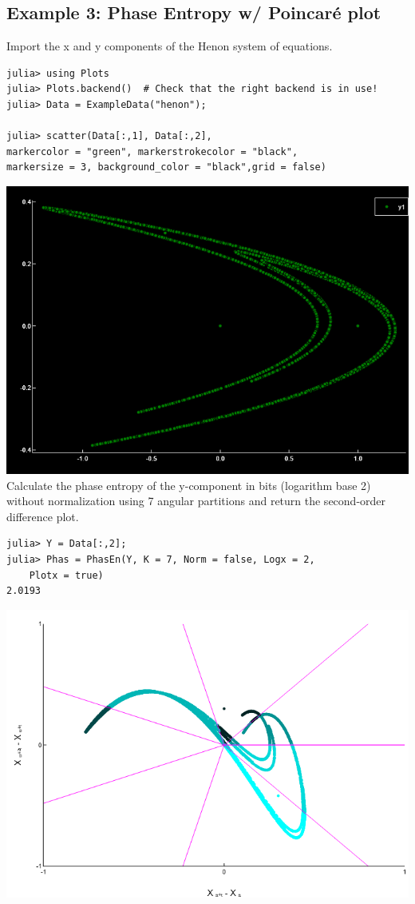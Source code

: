 \documentclass[12pt, a4paper, titlepage, openany]{book}
\begin{document}
\newpage
\subsection{\normalsize Example 3: \hspace{15mm} Phase Entropy w/ Poincaré plot}
\noindent Import the x and y components of the Henon system of equations.
\begin{verbatim}
julia> using Plots
julia> Plots.backend()  # Check that the right backend is in use! 
julia> Data = ExampleData("henon");

julia> scatter(Data[:,1], Data[:,2], 
markercolor = "green", markerstrokecolor = "black",
markersize = 3, background_color = "black",grid = false)
\end{verbatim}
\includegraphics[scale=.5]{henonjl.png}\newline \newline
Calculate the phase entropy of the y-component in bits (logarithm base 2) without normalization using 7 angular partitions and return the second-order difference plot.
\begin{verbatim}
julia> Y = Data[:,2];
julia> Phas = PhasEn(Y, K = 7, Norm = false, Logx = 2, 
	Plotx = true)
2.0193
\end{verbatim}
\includegraphics[scale=.5]{phasx1jl.png}\newline \newline
\end{document}
